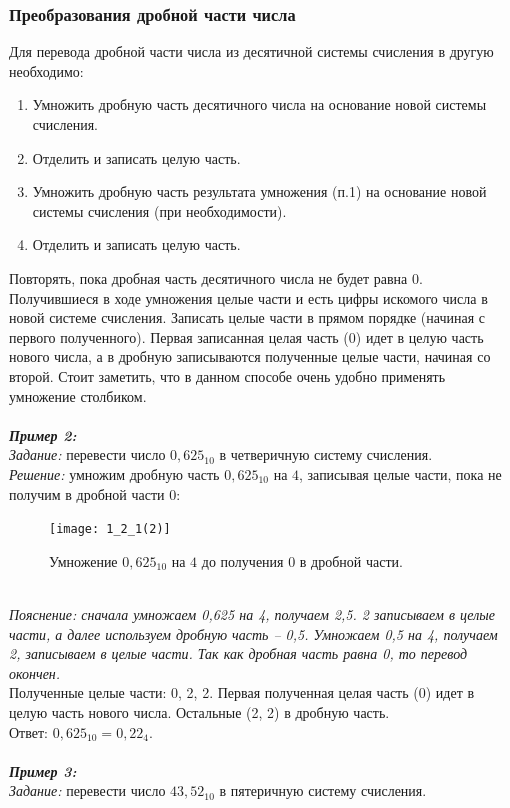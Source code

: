 \subsubsection{Преобразования дробной части числа}
Для перевода дробной части числа из десятичной системы счисления в другую необходимо:
\begin{enumerate}
\item Умножить дробную часть десятичного числа на основание новой системы счисления.
\item Отделить и записать целую часть.
\item Умножить дробную часть результата умножения (п.1) на основание новой системы счисления (при необходимости).
\item Отделить и записать целую часть.
\end{enumerate}
Повторять, пока дробная часть десятичного числа не будет равна 0.
\\Получившиеся в ходе умножения целые части и есть цифры искомого числа в новой системе счисления. Записать целые части в прямом порядке (начиная с первого полученного). Первая записанная целая часть (0) идет в целую часть нового числа, а в дробную записываются полученные целые части, начиная со второй. Стоит заметить, что в данном способе очень удобно применять умножение столбиком.
\\
\\\emph{\textbf{Пример 2:}}
\\\emph{Задание:} перевести число $0,625_{10}$ в четверичную систему счисления.
\\\emph{Решение:} умножим дробную часть $0,625_{10}$ на $4$, записывая целые части, пока не получим в дробной части 0:
\begin{figure}[h]
\centering
\texttt{[image: 1\_2\_1(2)]}
\caption{Умножение $0,625_{10}$ на $4$ до получения 0 в дробной части.}
\end{figure}
\\\emph{Пояснение: сначала умножаем 0,625 на 4, получаем 2,5. 2 записываем в целые части, а далее используем дробную часть -- 0,5. Умножаем 0,5 на 4, получаем 2, записываем в целые части. Так как дробная часть равна 0, то перевод окончен.}
\\Полученные целые части: 0, 2, 2. Первая полученная целая часть (0) идет в целую часть нового числа. Остальные (2, 2) в дробную часть.
\\Ответ: $0,625_{10} = 0,22_{4}$.
\\
\\\emph{\textbf{Пример 3:}}
\\\emph{Задание:} перевести число $43,52_{10}$ в пятеричную систему счисления.
